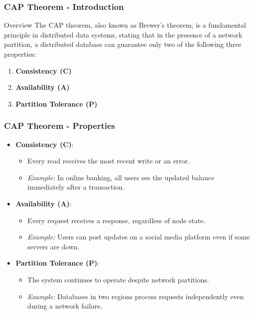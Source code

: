 \documentclass[aspectratio=169]{beamer}
\begin{document}
\begin{frame}[fragile]
    \frametitle{CAP Theorem - Introduction}
    \begin{block}{Overview}
        The CAP theorem, also known as Brewer's theorem, is a fundamental principle in distributed data systems, stating that in the presence of a network partition, a distributed database can guarantee only two of the following three properties:
    \end{block}
    \begin{enumerate}
        \item \textbf{Consistency (C)}
        \item \textbf{Availability (A)}
        \item \textbf{Partition Tolerance (P)}
    \end{enumerate}
\end{frame}

\begin{frame}[fragile]
    \frametitle{CAP Theorem - Properties}
    \begin{itemize}
        \item \textbf{Consistency (C)}: 
        \begin{itemize}
            \item Every read receives the most recent write or an error.
            \item \textit{Example:} In online banking, all users see the updated balance immediately after a transaction.
        \end{itemize}
        
        \item \textbf{Availability (A)}: 
        \begin{itemize}
            \item Every request receives a response, regardless of node state.
            \item \textit{Example:} Users can post updates on a social media platform even if some servers are down.
        \end{itemize}
        
        \item \textbf{Partition Tolerance (P)}: 
        \begin{itemize}
            \item The system continues to operate despite network partitions.
            \item \textit{Example:} Databases in two regions process requests independently even during a network failure.
        \end{itemize}
    \end{itemize}
\end{frame}
\end{document}
